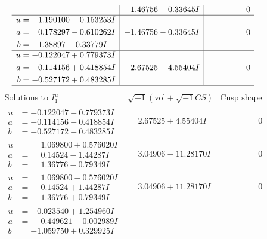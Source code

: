 \documentclass[1p]{elsarticle_modified}
\theoremstyle{definition}
\newcommand{\I}{\sqrt{-1}}
\begin{document}
$$\begin{array}{c|c|c}
 & -1.46756 + 0.33645 I & \phantom{-0.000000 } 0 \\ \hline\begin{aligned}
u &= -1.190100 - 0.153253 I \\
a &= \phantom{-}0.178297 - 0.610262 I \\
b &= \phantom{-}1.38897 - 0.33779 I\end{aligned}
 & -1.46756 - 0.33645 I & \phantom{-0.000000 } 0 \\ \hline\begin{aligned}
u &= -0.122047 + 0.779373 I \\
a &= -0.114156 + 0.418854 I \\
b &= -0.527172 + 0.483285 I\end{aligned}
 & \phantom{-}2.67525 - 4.55404 I & \phantom{-0.000000 } 0\\
 \hline 
 \end{array}$$\newpage$$\begin{array}{c|c|c}  
\text{Solutions to }I^u_{1}& \I (\text{vol} + \sqrt{-1}CS) & \text{Cusp shape}\\
 \hline 
\begin{aligned}
u &= -0.122047 - 0.779373 I \\
a &= -0.114156 - 0.418854 I \\
b &= -0.527172 - 0.483285 I\end{aligned}
 & \phantom{-}2.67525 + 4.55404 I & \phantom{-0.000000 } 0 \\ \hline\begin{aligned}
u &= \phantom{-}1.069800 + 0.576020 I \\
a &= \phantom{-}0.14524 - 1.44287 I \\
b &= \phantom{-}1.36776 - 0.79349 I\end{aligned}
 & \phantom{-}3.04906 - 11.28170 I & \phantom{-0.000000 } 0 \\ \hline\begin{aligned}
u &= \phantom{-}1.069800 - 0.576020 I \\
a &= \phantom{-}0.14524 + 1.44287 I \\
b &= \phantom{-}1.36776 + 0.79349 I\end{aligned}
 & \phantom{-}3.04906 + 11.28170 I & \phantom{-0.000000 } 0 \\ \hline\begin{aligned}
u &= -0.023540 + 1.254960 I \\
a &= \phantom{-}0.449621 - 0.002989 I \\
b &= -1.059750 + 0.329925 I\end{aligned}

\end{array}$$
\end{document}
